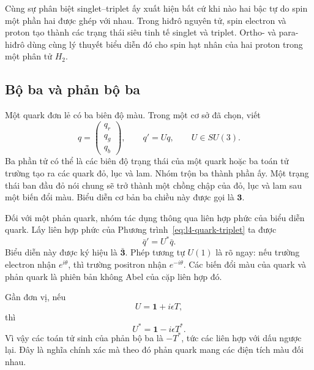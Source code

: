Cùng sự phân biệt singlet--triplet ấy xuất hiện bất cứ khi nào hai bậc tự do spin một phần hai được ghép với nhau. Trong hiđrô nguyên tử, spin electron và proton tạo thành các trạng thái siêu tinh tế singlet và triplet. Ortho- và para-hiđrô dùng cùng lý thuyết biểu diễn đó cho spin hạt nhân của hai proton trong một phân tử \(H_2\).

\subsection{Bộ ba và phản bộ ba}

Một quark đơn lẻ có ba biên độ màu. Trong một cơ sở đã chọn, viết
\begin{equation}
q=
\begin{pmatrix}
q_r\\q_g\\q_b
\end{pmatrix},
\qquad
q'=Uq,
\qquad U\in SU(3).
\label{eq:l4-quark-triplet}
\end{equation}
Ba phần tử có thể là các biên độ trạng thái của một quark hoặc ba toán tử trường tạo ra các quark đỏ, lục và lam. Nhóm trộn ba thành phần ấy. Một trạng thái ban đầu đỏ nói chung sẽ trở thành một chồng chập của đỏ, lục và lam sau một biến đổi màu. Biểu diễn cơ bản ba chiều này được gọi là \(\boldsymbol 3\).

Đối với một phản quark, nhóm tác dụng thông qua liên hợp phức của biểu diễn quark. Lấy liên hợp phức của Phương trình~\eqref{eq:l4-quark-triplet} ta được
\begin{equation}
\bar q'=U^*\bar q.
\end{equation}
Biểu diễn này được ký hiệu là \(\bar{\boldsymbol 3}\). Phép tương tự \(U(1)\) là rõ ngay: nếu trường electron nhận \(e^{i\theta}\), thì trường positron nhận \(e^{-i\theta}\). Các biến đổi màu của quark và phản quark là phiên bản không Abel của cặp liên hợp đó.

Gần đơn vị, nếu
\begin{equation}
U=\boldsymbol 1+i\epsilon T,
\end{equation}
thì
\begin{equation}
U^*=\boldsymbol 1-i\epsilon T^*.
\end{equation}
Vì vậy các toán tử sinh của phản bộ ba là \(-T^*\), tức các liên hợp với dấu ngược lại. Đây là nghĩa chính xác mà theo đó phản quark mang các điện tích màu đối nhau.

